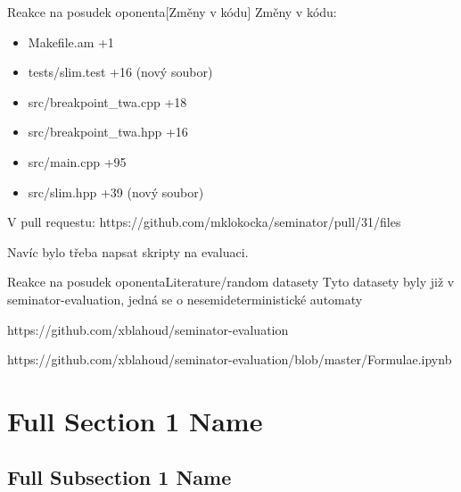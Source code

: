 \documentclass[
]{beamer}
\begin{document}
	\begin{frame}{Reakce na posudek oponenta}[Změny v kódu]
		Změny v kódu:
		\begin{itemize}
			\item Makefile.am +1
			\item tests/slim.test +16 (nový soubor)
			\item src/breakpoint\_twa.cpp +18
			
			\item src/breakpoint\_twa.hpp +16
			
			\item src/main.cpp +95
			
			\item src/slim.hpp +39 (nový soubor)
		\end{itemize}
		V pull requestu: https://github.com/mklokocka/seminator/pull/31/files
		
					
		Navíc bylo třeba napsat skripty na evaluaci.
	\end{frame}

	\begin{frame}{Reakce na posudek oponenta}{Literature/random datasety}
		Tyto datasety byly již v seminator-evaluation, jedná se o nesemideterministické automaty
		
		
		{https://github.com/xblahoud/seminator-evaluation}
		
		{https://github.com/xblahoud/seminator-evaluation/blob/master/Formulae.ipynb}
		
	\end{frame}
	\section[Short Section 1 Name]{Full Section 1 Name}
	\subsection[Short Subsection 1 Name]{Full Subsection 1 Name}
	
\end{document}
